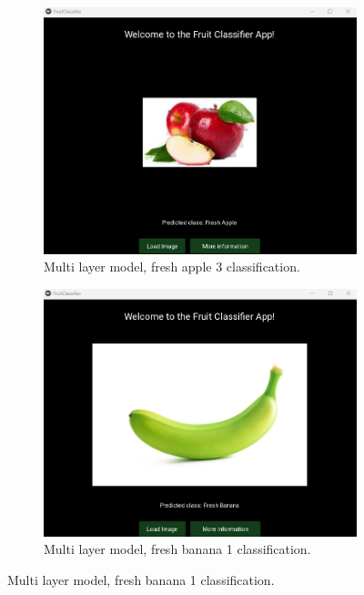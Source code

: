 \documentclass[conference]{IEEEtran}
\begin{document}
\begin{figure}[h]
\begin{subfigure}[b]{0.48\linewidth}
    \end{subfigure}
    \hfill
    \begin{subfigure}[b]{0.48\linewidth}
        \centering
        \includegraphics[width=\linewidth]{Mlayer appel3.png}
        \caption{Multi layer model, fresh apple 3 classification.}
        \label{figFB}
    \end{subfigure}
    \hfill
    \begin{subfigure}[b]{0.48\linewidth}
        \centering
        \includegraphics[width=\linewidth]{Mlayer banana1.png}
        \caption{Multi layer model, fresh banana 1 classification.}
        \label{figFA}
    \end{subfigure}

\end{figure}
\end{document}
